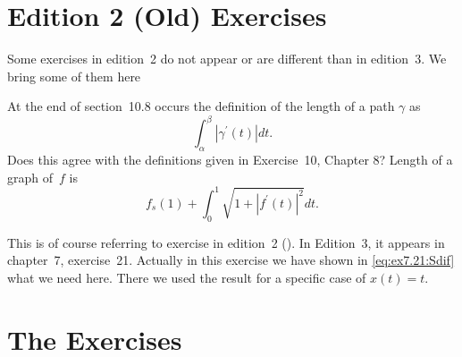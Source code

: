 \section{Edition 2 (Old) Exercises} %

Some exercises in edition~2 do not appear or are different than in edition~3.
We bring some of them here

\begin{enumerate}

\iffalse
\begin{excopy}
   If $A$ and $B$ are disjoint subsets of the plane, if $A$ is compact,
   and if $B$ is closed, then there exists
   a~\(\delta > 0\) such that \(|\alpha-\beta| \geq 0\) for all
   \(\alpha \in A\) and \(\beta \in B\). Prove this with an arbitrary
   metric space in place of the plane.
\end{excopy}
  Let $d$ be the metric. Define
  \[G_n = \{x \in A: d(x,B) > 1/n\}\]
  for all \(n>0\). It is clear that for all \(x\in A\) \(d(x,B)>0\)
  and so \(\cup G_n = A\). Since A is compact there exists $m$ such that
  \(\cup_{n=1}^m G_n = A\).
  Hence, for all \(x\in A\) \(d(x,B)>1/m\)
  Put \(\delta=1/m\) that satsify the requirement.
\fi

\setcounter{enumi}{1}
\begin{excopy}
    At the end of section~10.8 occurs the definition of the length of a path
    \(\gamma\) as
    \[\int_\alpha^\beta|{\gamma^\prime}(t)|dt.\]
    Does this agree with the definitions given in Exercise~10, Chapter 8?
    Length of a graph of~$f$ is
       \[f_s(1) + \int_0^1 \sqrt{1 + |f^\prime(t)|^2}dt.\]
\end{excopy}

 This is of course referring to exercise in
edition~2 (\cite{RudinRCA80}).
In Edition~3, it appears in chapter~7, exercise~21.
Actually in this exercise we have shown in \eqref{eq:ex7.21:Sdif}
what we need here. There we used the result for a specific case
of \(x(t)=t\).

\end{enumerate}


\section{The Exercises} %


